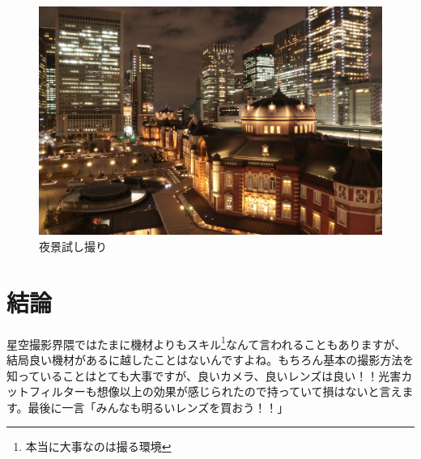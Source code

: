 \documentclass[supernova_2023]{subfiles}
\begin{document}
\begin{figure}[H]
\begin{center}
  \includegraphics[width=14cm]{figures/Maruyama/tokyo.jpg}
\caption{夜景試し撮り}
\end{center}
\end{figure}
\section{\texorpdfstring{結論\footnotemark}{結論}}
星空撮影界隈ではたまに機材よりもスキル\footnote{本当に大事なのは撮る環境}なんて言われることもありますが、結局良い機材があるに越したことはないんですよね。もちろん基本の撮影方法を知っていることはとても大事ですが、良いカメラ、良いレンズは良い！！光害カットフィルターも想像以上の効果が感じられたので持っていて損はないと言えます。最後に一言「みんなも明るいレンズを買おう！！」
\end{document}
